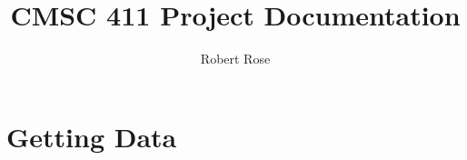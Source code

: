 \documentclass[11pt]{article}
\title{CMSC 411 Project Documentation}
\author{Robert Rose}
\makeatletter
\let\inserttitle\@title
\let\insertauthor\@author
\makeatother
\begin{document}
\begin{center}
  \LARGE{\inserttitle}

  \Large{\insertauthor}
\end{center}

\section{Getting Data}




\printbibliography
\end{document}
